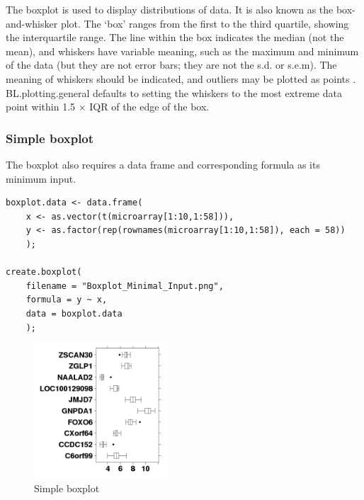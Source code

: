 \documentclass[letterpaper]{article}
\begin{document}
The boxplot is used to display distributions of data. It is also known as the box-and-whisker plot. The `box' ranges from the first to the third quartile, showing the interquartile range. The line within the box indicates the median (not the mean), and whiskers have variable meaning, such as the maximum and minimum of the data (but they are not error bars; they are not the s.d. or s.e.m). The meaning of whiskers should be indicated, and outliers may be plotted as points \cite{Krzywinski}. BL.plotting.general defaults to setting the whiskers to the most extreme data point within 1.5 $\times$ IQR of the edge of the box.

\subsubsection{Simple boxplot}
The boxplot also requires a data frame and corresponding formula as its minimum input.
\begin{verbatim}
boxplot.data <- data.frame(
    x <- as.vector(t(microarray[1:10,1:58])),
    y <- as.factor(rep(rownames(microarray[1:10,1:58]), each = 58))
    );
    
create.boxplot(
    filename = "Boxplot_Minimal_Input.png",
    formula = y ~ x, 
    data = boxplot.data
    );
\end{verbatim}
\begin{figure}[!ht]
  \begin{center}
     \includegraphics[width=50mm]{Figures/Boxplot_Minimal_Input.png}
     \caption{Simple boxplot}
  \end{center}
\end{figure}
\end{document}
